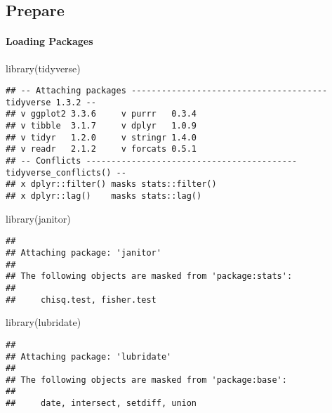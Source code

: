 \documentclass[
]{article}
\newenvironment{Shaded}{\begin{snugshade}}{\end{snugshade}}
\newcommand{\FunctionTok}[1]{\textcolor[rgb]{0.00,0.00,0.00}{#1}}
\newcommand{\NormalTok}[1]{#1}
\begin{document}
\hypertarget{prepare}{%
\subsection{Prepare}\label{prepare}}

\hypertarget{loading-packages}{%
\paragraph{Loading Packages}\label{loading-packages}}

\begin{Shaded}
\begin{Highlighting}[]
\FunctionTok{library}\NormalTok{(tidyverse)}
\end{Highlighting}
\end{Shaded}

\begin{verbatim}
## -- Attaching packages --------------------------------------- tidyverse 1.3.2 --
## v ggplot2 3.3.6     v purrr   0.3.4
## v tibble  3.1.7     v dplyr   1.0.9
## v tidyr   1.2.0     v stringr 1.4.0
## v readr   2.1.2     v forcats 0.5.1
## -- Conflicts ------------------------------------------ tidyverse_conflicts() --
## x dplyr::filter() masks stats::filter()
## x dplyr::lag()    masks stats::lag()
\end{verbatim}

\begin{Shaded}
\begin{Highlighting}[]
\FunctionTok{library}\NormalTok{(janitor)}
\end{Highlighting}
\end{Shaded}

\begin{verbatim}
## 
## Attaching package: 'janitor'
## 
## The following objects are masked from 'package:stats':
## 
##     chisq.test, fisher.test
\end{verbatim}

\begin{Shaded}
\begin{Highlighting}[]
\FunctionTok{library}\NormalTok{(lubridate)}
\end{Highlighting}
\end{Shaded}

\begin{verbatim}
## 
## Attaching package: 'lubridate'
## 
## The following objects are masked from 'package:base':
## 
##     date, intersect, setdiff, union
\end{verbatim}
\end{document}
